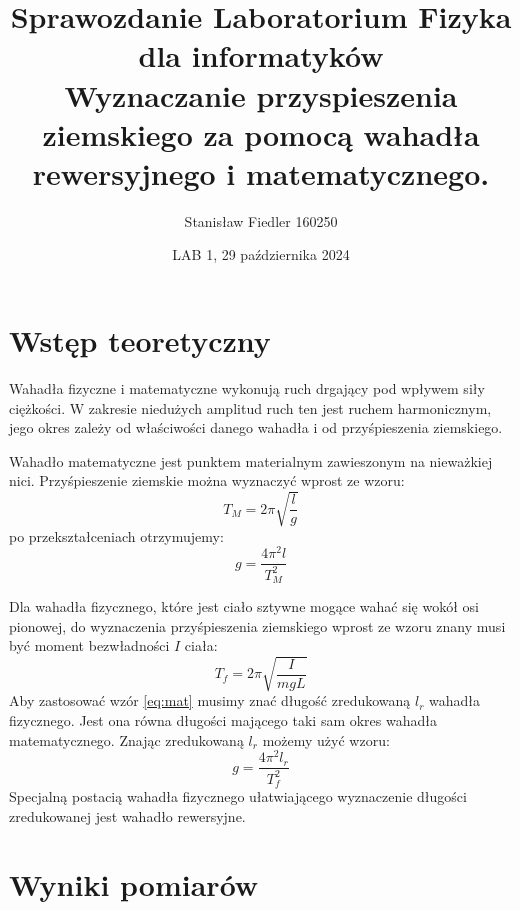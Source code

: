 \documentclass[a4paper, 11pt]{article}
\title{%
        \vspace{-1cm}
       \large Sprawozdanie Laboratorium Fizyka dla informatyków \\
       \huge Wyznaczanie przyspieszenia ziemskiego za pomocą wahadła rewersyjnego i matematycznego.}
\author{Stanisław Fiedler 160250}
\date{LAB 1, 29 października 2024}
\begin{document}
\maketitle

\section{Wstęp teoretyczny}\label{sec:wstep} %
Wahadła fizyczne i matematyczne wykonują ruch drgający pod wpływem siły ciężkości.
W zakresie niedużych amplitud ruch ten jest ruchem harmonicznym,
jego okres zależy od właściwości danego wahadła i od przyśpieszenia ziemskiego.

Wahadło matematyczne jest punktem materialnym zawieszonym na nieważkiej nici.
Przyśpieszenie ziemskie można wyznaczyć wprost ze wzoru:
\begin{equation}\label{eq:mat}
	T_M = 2\pi\sqrt{\frac{l}{g}}
\end{equation}
po przekształceniach otrzymujemy:
\begin{equation}\label{eq:g_mat}
	g = \frac{4\pi^2l}{T^2_M}
\end{equation}

Dla wahadła fizycznego, które jest ciało sztywne mogące wahać się wokół osi pionowej,
do wyznaczenia przyśpieszenia ziemskiego wprost ze wzoru znany musi być moment bezwładności $I$ ciała:
\[
	T_f = 2\pi\sqrt{\frac{I}{mgL}}
\]
Aby zastosować wzór \eqref{eq:mat} musimy znać długość zredukowaną $l_r$ wahadła fizycznego.
Jest ona równa długości mającego taki sam okres wahadła matematycznego.
Znając zredukowaną $l_r$ możemy użyć wzoru:
\begin{equation}\label{eq:g_rew}
	g = \frac{4\pi^2l_r}{T^2_f}
\end{equation}
Specjalną postacią wahadła fizycznego ułatwiającego wyznaczenie długości zredukowanej jest wahadło rewersyjne.


\section{Wyniki pomiarów}\label{sec:wyniki_pomiarow} %
\end{document}
